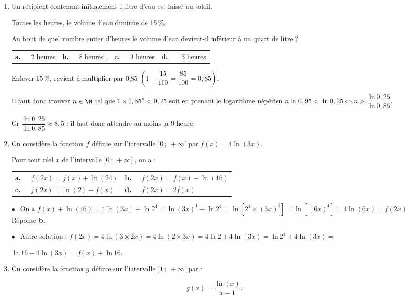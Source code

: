 \bigskip
\begin{enumerate}
\item Un récipient contenant initialement 1 litre d'eau est laissé au soleil.

Toutes les heures, le volume d'eau diminue de 15\,\%.

Au bout de quel nombre entier d'heures le volume d'eau devient-il inférieur à un quart de litre ?

\begin{center}
\begin{tabularx}{\linewidth}{*{4}{X}}
\textbf{a.~~} 2 heures &\textbf{b.~~} 8 heures .&\textbf{c.~~} 9 heures
&\textbf{d.~~} 13 heures
\end{tabularx}
\end{center}
Enlever 15\,\%, revient à multiplier par 0,85 $\left(1 - \dfrac{15}{100} = \dfrac{85}{100} = 0,85 \right)$.

Il faut donc trouver $n \in \N$ tel que $1 \times 0,85^n < 0,25$ soit en prenant le logarithme népérien $n\ln 0,95 < \ln 0,25 \iff n > \dfrac{\ln 0,25}{\ln 0,85}$.

Or $\dfrac{\ln 0,25}{\ln 0,85} \approx 8,5$ : il faut donc attendre au moins la 9 heure.
\item  On considère la fonction $f$ définie sur l'intervalle $]0~;~+\infty[$ par $f(x) = 4\ln (3x)$.

Pour tout réel $x$ de l'intervalle $]0~;~+\infty[$ , on a :

\begin{center}
\begin{tabularx}{\linewidth}{*{2}{X}}
\textbf{a.~~} $f(2x) = f(x) + \ln (24)$&\textbf{b.~~} $f(2x) = f(x) + \ln (16)$\\
\textbf{c.~~} $f(2x) = \ln (2) + f(x)$& \textbf{d.~~} $f(2x) = 2f(x)$
\end{tabularx}
\end{center}

$\bullet~~$ On a $f(x) + \ln (16) = 4 \ln (3x) + \ln 2^4= \ln (3x)^4  + \ln 2^4 = \ln \left[2^4 \times (3x)^4\right] = \ln \left[(6x)^4\right] = 4 \ln (6x) = f(2x)$ Réponse \textbf{b.}

$\bullet~~$ Autre solution : $f(2x) = 4\ln (3 \times 2x) = 4 \ln (2 \times 3x) = 4\ln 2 + 4\ln (3x) = \ln 2^4 + 4\ln (3x) =$

$ \ln 16 + 4\ln (3x) = f(x) + \ln 16$.
\item On considère la fonction $g$ définie sur l'intervalle $]1~;~+\infty[$ par : 

\[g(x) = \dfrac{\ln (x)}{x - 1}.\]



\end{enumerate}
